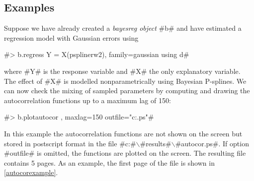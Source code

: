 \subsection*{Examples}

Suppose we have already created a {\em bayesreg object} #b# and
have estimated a regression model with Gaussian errors using

#> b.regress Y = X(psplinerw2), family=gaussian using d#

where #Y# is the response variable and #X# the only explanatory
variable. The effect of #X# is modelled nonparametrically  using
Bayesian P-splines. We can now check the mixing of sampled
parameters by computing and drawing the autocorrelation functions
up to a maximum lag of 150:

#> b.plotautocor , maxlag=150 outfile="c:\results\autocor.ps"#

In this example the autocorrelation functions are not shown on the
screen but stored in postscript format in the file
#c:#$\backslash$#results#$\backslash$#autocor.ps#. If option #outfile#
is omitted, the functions are plotted on the screen. The resulting
file contains 5 pages. As an example, the first page of the file
is shown in \autoref{autocorexample}.

